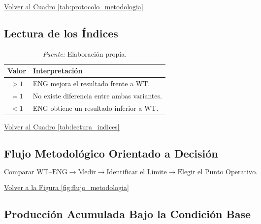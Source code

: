 \begin{center}
\small\hyperref[tab:protocolo_metodologia]{Volver al Cuadro \ref*{tab:protocolo_metodologia}}
\end{center}


\subsection{Lectura de los Índices}
\label{anx:tab_lectura_indices}

\begin{table}[H]
\centering
\caption{Lectura de los Índices}
\caption*{\small\textit{Fuente:} Elaboración propia.}
\renewcommand{\arraystretch}{1.25}
\begin{tabular}{|c|p{9.5cm}|}
\hline
Valor & Interpretación \\ \hline
\(>1\) & ENG mejora el resultado frente a WT. \\ \hline
\(=1\) & No existe diferencia entre ambas variantes. \\ \hline
\(<1\) & ENG obtiene un resultado inferior a WT. \\ \hline
\end{tabular}
\end{table}

\begin{center}
\small\hyperref[tab:lectura_indices]{Volver al Cuadro \ref*{tab:lectura_indices}}
\end{center}


\subsection{Flujo Metodológico Orientado a Decisión}
\label{anx:fig_flujo}

\begin{equation}
\text{Comparar WT--ENG}
\longrightarrow
\text{Medir}
\longrightarrow
\text{Identificar el Límite}
\longrightarrow
\text{Elegir el Punto Operativo}.
\end{equation}

\begin{center}
\small\hyperref[fig:flujo_metodologia]{Volver a la Figura \ref*{fig:flujo_metodologia}}
\end{center}


\subsection{Producción Acumulada Bajo la Condición Base}
\label{anx:fig_produccion}


